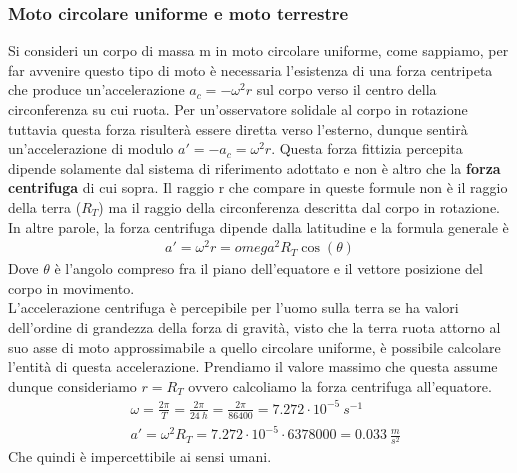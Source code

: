 \documentclass[10pt,a4paper]{article}
\begin{document}
\subsubsection*{Moto circolare uniforme e moto terrestre}
Si consideri un corpo di massa m in moto circolare uniforme, come sappiamo, per far avvenire questo tipo di moto è necessaria l'esistenza di una forza centripeta che produce un'accelerazione $a_c=-\omega^2r$ sul corpo verso il centro della circonferenza su cui ruota. Per un'osservatore solidale al corpo in rotazione tuttavia questa forza risulterà essere diretta verso l'esterno, dunque sentirà un'accelerazione di modulo $a'=-a_c=\omega^2r$. Questa forza fittizia percepita dipende solamente dal sistema di riferimento adottato e non è altro che la \textbf{forza centrifuga} di cui sopra. Il raggio r che compare in queste formule non è il raggio della terra ($R_T$) ma il raggio della circonferenza descritta dal corpo in rotazione. In altre parole, la forza centrifuga dipende dalla latitudine e la formula generale è
\begin{align*}
a'=\omega^2 r = omega^2 R_T \cos(\theta)
\end{align*}
Dove $\theta$ è l'angolo compreso fra il piano dell'equatore e il vettore posizione del corpo in movimento.\\
L'accelerazione centrifuga è percepibile per l'uomo sulla terra se ha valori dell'ordine di grandezza della forza di gravità, visto che la terra ruota attorno al suo asse di moto approssimabile a quello circolare uniforme, è possibile calcolare l'entità di questa accelerazione. Prendiamo il valore massimo che questa assume dunque consideriamo $r = R_T$ ovvero calcoliamo la forza centrifuga all'equatore. 
\begin{align*}
	&\omega = \frac{2\pi}{T}= \frac{2\pi}{24\ h} = \frac{2\pi}{86400}= 7.272\cdot 10^{-5}\ s^{-1}\\
	&a'=\omega^2 R_T=7.272\cdot 10^{-5}\cdot 6378000 = 0.033\ \frac{m}{s^2}
\end{align*}
Che quindi è impercettibile ai sensi umani.
\end{document}

